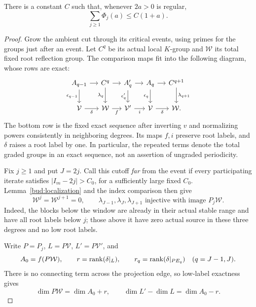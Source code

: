 \begin{theorem}\label{thm:finite-cut-budget}
There is a constant $C$ such that, whenever $2a>0$ is regular,
\begin{equation}\label{bud:linear-budget}
 \sum_{j\ge1}\Phi_j(a)\le C(1+a).
\end{equation}
\end{theorem}

\begin{proof}
Grow the ambient cut through its critical events, using primes for the
groups just after an event. Let $C^q$ be its actual local $K$-group and
$\mathcal W$ its total fixed root reflection group. The comparison
maps fit into the following diagram, whose rows are exact:
\begin{equation}\label{bud:crossing-diagram}
 \begin{tikzcd}[column sep=small]
 A_{q-1}\arrow[r]\arrow[d,"\epsilon_{q-1}"'] &
 C^q\arrow[r]\arrow[d,"\lambda_q"'] &
 A'_q\arrow[r]\arrow[d,"\epsilon'_q"'] &
 A_q\arrow[r]\arrow[d,"\epsilon_q"'] &
 C^{q+1}\arrow[d,"\lambda_{q+1}"]\\
 \mathcal V\arrow[r,"\delta"'] &
 \mathcal W\arrow[r,"f"'] &
 \mathcal V'\arrow[r,"i"'] &
 \mathcal V\arrow[r,"\delta"'] &\mathcal W.
 \end{tikzcd}
\end{equation}
The bottom row is the fixed exact sequence after inverting $v$ and
normalizing powers consistently in neighboring degrees. Its maps $f,i$
preserve root labels, and $\delta$ raises a root label by one. In
particular, the repeated terms denote the total graded groups in an
exact sequence, not an assertion of ungraded periodicity.

Fix $j\ge1$ and put $J=2j$. Call this cutoff \emph{far} from the event
if every participating iterate satisfies
$|I_m-2j|>C_0$, for a sufficiently large fixed $C_0$.
Lemma~\ref{bud:localization} and the index comparison then give
\begin{equation}\label{bud:far-local}
 \mathcal W^j=\mathcal W^{j+1}=0,
 \qquad
 \lambda_{J-1},\lambda_J,\lambda_{J+1}
 \text{ injective with image }P_j\mathcal W.
\end{equation}
Indeed, the blocks below the window are already in their actual stable
range and have all root labels below $j$; those above it have zero
actual source in these three degrees and no low root labels.

Write $P=P_j$, $L=P\mathcal V$, $L'=P\mathcal V'$, and
\[
 A_0=f(P\mathcal W),\qquad
 r=\operatorname{rank}(\delta|_L),\qquad
 r_q=\operatorname{rank}(\delta|_{PE_q})\quad(q=J-1,J).
\]
There is no connecting term across the projection edge, so low-label
exactness gives
\begin{equation}\label{bud:low-dimensions}
 \dim P\mathcal W=\dim A_0+r,
 \qquad \dim L'-\dim L=\dim A_0-r.
\end{equation}


\end{proof}
